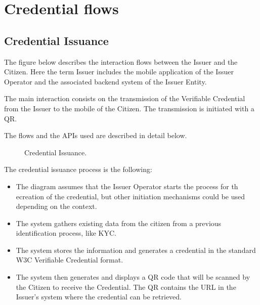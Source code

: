 \documentclass[letterpaper,10pt,english]{sphinxmanual}
\begin{document}
\section{Credential flows}
\label{\detokenize{privacycred:credential-flows}}

\subsection{Credential Issuance}
\label{\detokenize{privacycred:credential-issuance}}
\sphinxAtStartPar
The figure below describes the interaction flows between the Issuer and the Citizen. Here the term Issuer includes the mobile application of the Issuer Operator and the associated backend system of the Issuer Entity.

\sphinxAtStartPar
The main interaction consists on the transmission of the Verifiable Credential from the Issuer to the mobile of the Citizen. The transmission is initiated with a QR.

\sphinxAtStartPar
The flows and the APIs used are described in detail below.

\begin{figure}[htbp]
\centering
\capstart

\noindent{}
\caption{Credential Issuance.}\label{\detokenize{privacycred:id7}}\end{figure}

\sphinxAtStartPar
The credential issuance process is the following:

\sphinxAtStartPar
{}
\begin{itemize}
\item {} 
\sphinxAtStartPar
The diagram assumes that the Issuer Operator starts the process for th ecreation of the credential, but other initiation mechanisms could be used depending on the context.

\item {} 
\sphinxAtStartPar
The system gathers existing data from the citizen from a previous identification process, like KYC.

\item {} 
\sphinxAtStartPar
The system stores the information and generates a credential in the standard W3C Verifiable Credential format.

\item {} 
\sphinxAtStartPar
The system then generates and displays a QR code that will be scanned by the Citizen to receive the Credential. The QR contains the URL in the Issuer’s system where the credential can be retrieved.

\end{itemize}
\end{document}
